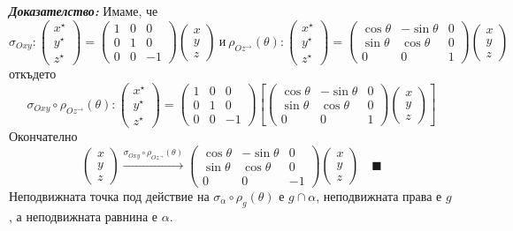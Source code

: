 \documentclass[12pt]{article}
\begin{document}
\textbf{\textit{Доказателство:}} Имаме, че $$\sigma_{Oxy}:\begin{pmatrix} x^\star \\ y^\star\\ z^\star\end{pmatrix}=\begin{pmatrix} 1 & 0 & 0 \\ 0 & 1 & 0 \\ 0 & 0 & -1\end{pmatrix}\begin{pmatrix} x\\ y\\ z\end{pmatrix}\ \text{и}\ \rho_{Oz^{\rightarrow}}(\theta):\begin{pmatrix} x^\star \\ y^\star\\ z^\star\end{pmatrix}=\begin{pmatrix} \cos\theta & -\sin\theta & 0 \\ \sin\theta & \cos\theta & 0 \\ 0 & 0 & 1\end{pmatrix}\begin{pmatrix} x\\ y\\ z\end{pmatrix}$$ откъдето $$\sigma_{Oxy}\circ\rho_{Oz^{\rightarrow}}(\theta):\begin{pmatrix} x^\star \\ y^\star\\ z^\star\end{pmatrix}=\begin{pmatrix} 1 & 0 & 0 \\ 0 & 1 & 0 \\ 0 & 0 & -1\end{pmatrix}\left[\begin{pmatrix} \cos\theta & -\sin\theta & 0 \\ \sin\theta & \cos\theta & 0 \\ 0 & 0 & 1\end{pmatrix}\begin{pmatrix} x\\ y\\ z\end{pmatrix}\right]$$ Окончателно $$\begin{pmatrix}x \\ y \\ z\end{pmatrix}\xrightarrow{\sigma_{Oxy}\circ\rho_{Oz^{\rightarrow}}(\theta)}\begin{pmatrix} \cos\theta & -\sin\theta & 0 \\ \sin\theta & \cos\theta & 0 \\ 0 & 0 & -1\end{pmatrix}\begin{pmatrix} x\\ y\\ z\end{pmatrix}\quad \blacksquare$$ Неподвижната точка под действие на $\sigma_{\alpha}\circ\rho_g(\theta)$ е $g\cap\alpha$, неподвижната права е $g$, а неподвижната равнина е $\alpha$.
\end{document}
